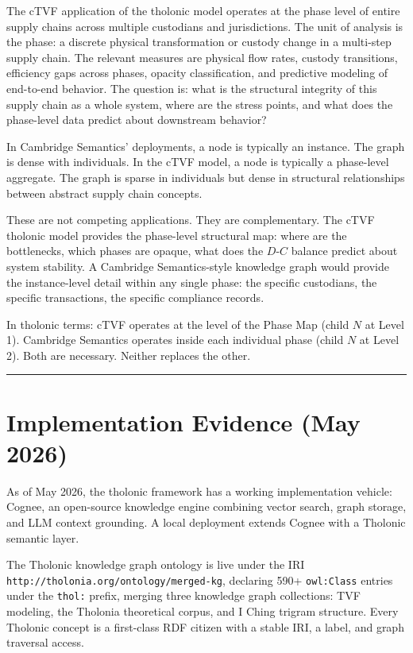 \documentclass[12pt]{article}
\begin{document}
The cTVF application of the tholonic model operates at the phase level
of entire supply chains across multiple custodians and jurisdictions.
The unit of analysis is the phase: a discrete physical transformation or
custody change in a multi-step supply chain. The relevant measures are
physical flow rates, custody transitions, efficiency gaps across phases,
opacity classification, and predictive modeling of end-to-end behavior.
The question is: what is the structural integrity of this supply chain
as a whole system, where are the stress points, and what does the
phase-level data predict about downstream behavior?

In Cambridge Semantics' deployments, a node is typically an instance.
The graph is dense with individuals. In the cTVF model, a node is
typically a phase-level aggregate. The graph is sparse in individuals
but dense in structural relationships between abstract supply chain
concepts.

These are not competing applications. They are complementary. The cTVF
tholonic model provides the phase-level structural map: where are the
bottlenecks, which phases are opaque, what does the \(D\)-\(C\) balance
predict about system stability. A Cambridge Semantics-style knowledge
graph would provide the instance-level detail within any single phase:
the specific custodians, the specific transactions, the specific
compliance records.

In tholonic terms: cTVF operates at the level of the Phase Map (child
\(N\) at Level 1). Cambridge Semantics operates inside each individual
phase (child \(N\) at Level 2). Both are necessary. Neither replaces the
other.

\begin{center}\rule{0.5\linewidth}{0.5pt}\end{center}

\section{Implementation Evidence (May 2026)}\label{implementation-evidence-may-2026}

As of May 2026, the tholonic framework has a working implementation
vehicle: Cognee, an open-source knowledge engine combining vector
search, graph storage, and LLM context grounding. A local deployment
extends Cognee with a Tholonic semantic layer.

The Tholonic knowledge graph ontology is live under the IRI
\texttt{http://tholonia.org/ontology/merged-kg}, declaring 590+
\texttt{owl:Class} entries under the \texttt{thol:} prefix, merging
three knowledge graph collections: TVF modeling, the Tholonia
theoretical corpus, and I Ching trigram structure. Every Tholonic
concept is a first-class RDF citizen with a stable IRI, a label, and
graph traversal access.
\end{document}
